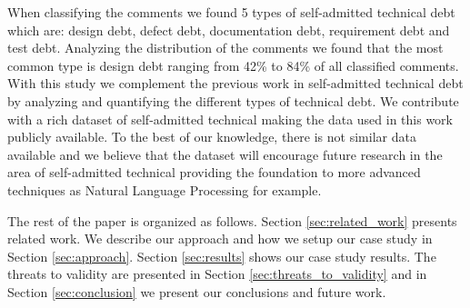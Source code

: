 When classifying the comments we found 5 types of self-admitted technical debt which are: design debt, defect debt, documentation debt, requirement debt and test debt. Analyzing the distribution of the comments we found that the most common type is design debt ranging from 42\% to 84\% of all classified comments. With this study we complement the previous work in self-admitted technical debt by analyzing and quantifying the different types of technical debt. We contribute with a rich dataset of self-admitted technical making the data used in this work publicly available. To the best of our knowledge, there is not similar data available and we believe that the dataset will encourage future research in the area of self-admitted technical providing the foundation to more advanced techniques as Natural Language Processing for example. 

The rest of the paper is organized as follows. Section \ref{sec:related_work} presents related work. We describe our approach and how we setup our case study in Section \ref{sec:approach}. Section \ref{sec:results} shows our case study results. The threats to validity are presented in Section \ref{sec:threats_to_validity} and in Section \ref{sec:conclusion} we present our conclusions and future work. 